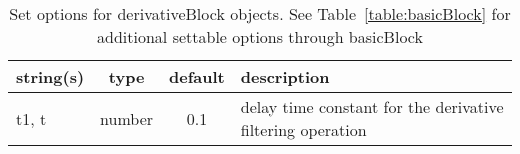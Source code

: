\begin{table}[ht]
\centering
\begin{tabular}{p{5cm} c c p{7cm}}
\hline
string(s) & type & default & description \\
\hline
t1, t & number & 0.1 & delay time constant for the derivative filtering operation\\
\hline
\end{tabular}
\caption{Set options for derivativeBlock objects. See Table~\ref{table:basicBlock} for additional settable options through basicBlock}
\label{table:derivativeBlock}
\end{table}

